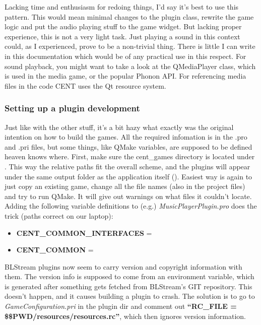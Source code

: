 \documentclass[letterpaper,10pt,english]{sphinxmanual}
\begin{document}
Lacking time and enthusiasm for redoing things, I'd say it's best to use this pattern. This would mean minimal changes to the plugin class, rewrite the game logic and put the audio playing stuff to the game widget. But lacking proper experience, this is not a very light task. Just playing a sound in this context could, as I experienced, prove to be a non-trivial thing. There is little I can write in this documentation which would be of any practical use in this respect. For sound playback, you might want to take a look at the QMediaPlayer class, which is used in the media game, or the popular Phonon API. For referencing media files in the code CENT uses the Qt resource system.


\subsubsection{Setting up a plugin development}
\label{index:setting-up-a-plugin-development}
Just like with the other stuff, it's a bit hazy what exactly was the original intention on how to build the games. All the required infomation is in the .pro and .pri files, but some things, like QMake variables, are supposed to be defined heaven knows where. First, make sure the cent\_games directory is located under . This way the relative paths fit the overall scheme, and the plugins will appear under the same output folder as the application itself (). Easiest way is again to just copy an existing game, change all the file names (also in the project files) and try to run QMake. It will give out warnings on what files it couldn't locate. Adding the following variable definitions to (e.g.) \emph{MusicPlayerPlugin.pro} does the trick (paths correct on our laptop):
\begin{itemize}
\item {} 
\textbf{CENT\_COMMON\_INTERFACES} = 

\item {} 
\textbf{CENT\_COMMON} = 

\end{itemize}

BLStream plugins now seem to carry version and copyright information with them. The version info is supposed to come from an environment variable, which is generated after something gets fetched from BLStream's GIT repository. This doesn't happen, and it causes building a plugin to crash. The solution is to go to \emph{GameConfiguration.pri} in the plugin dir and comment out \textbf{``RC\_FILE = \$\$PWD/resources/resources.rc''}, which then ignores version information.
\end{document}

